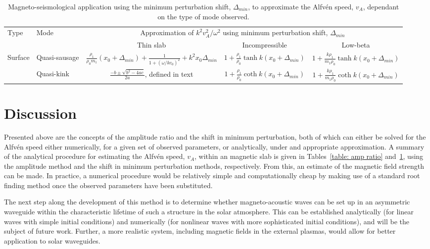 \documentclass[namedreferences]{solarphysics}
\numberwithin{equation}{section}
\begin{document}
\begin{article}
\begin{landscape}
\begin{table}
\caption{Magneto-seismological application using the minimum perturbation shift, $\Delta_{min}$, to approximate the Alfv\'{e}n speed, $v_A$, dependant on the type of mode observed.}
\begin{tabular}{llccc}
  \toprule
Type & Mode & \multicolumn{3}{c}{Approximation of $k^2v_A^2 / \omega^2$ using minimum perturbation shift, $\Delta_{min}$} \\
\cmidrule(lr){3-5}
	 &	    & Thin slab & Incompressible & Low-beta \\
  \midrule
\multirow{2}{*}{Surface} & Quasi-sausage & $ \frac{\rho_1}{\rho_0m_1}(x_0 + \Delta_{min}) + \frac{1}{1 + (\omega / kc_0)^2} + k^2x_0\Delta_{min} $ & $ 1 + \frac{\rho_1}{\rho_0}\tanh{k(x_0 + \Delta_{min})} $ & $ 1 + \frac{k\rho_1}{m_1\rho_0}\tanh{k(x_0 + \Delta_{min})} $ \\
						   & Quasi-kink	   & $\frac{-b \pm \sqrt{b^2 - 4ac}}{2a}$, defined in text & $ 1 + \frac{\rho_1}{\rho_0}\coth{k(x_0 + \Delta_{min})} $ & $ 1 + \frac{k\rho_1}{m_1\rho_0}\coth{k(x_0 + \Delta_{min})} $ \\
  \bottomrule
\end{tabular} \label{table: shift in min pert}
\end{table}

\end{landscape}

\section{Discussion}

Presented above are the concepts of the amplitude ratio and the shift in minimum perturbation, both of which can either be solved for the Alfv\'{e}n speed either numerically, for a given set of observed parameters, or analytically, under and appropriate approximation. A summary of the analytical procedure for estimating the Alfv\'{e}n speed, $v_A$, within an magnetic slab is given in Tables~\ref{table: amp ratio} and~\ref{table: shift in min pert}, using the amplitude method and the shift in minimum perturbation methods, respectively. From this, an estimate of the magnetic field strength can be made. In practice, a numerical procedure would be relatively simple and computationally cheap by making use of a standard root finding method once the observed parameters have been substituted.

The next step along the development of this method is to determine whether magneto-acoustic waves can be set up in an asymmetric waveguide within the characteristic lifetime of such a structure in the solar atmosphere. This can be established analytically (for linear waves with simple initial conditions) and numerically (for nonlinear waves with more sophisticated initial conditions), and will be the subject of future work. Further, a more realistic system, including magnetic fields in the external plasmas, would allow for better application to solar waveguides.






\end{article} 
\end{document}
